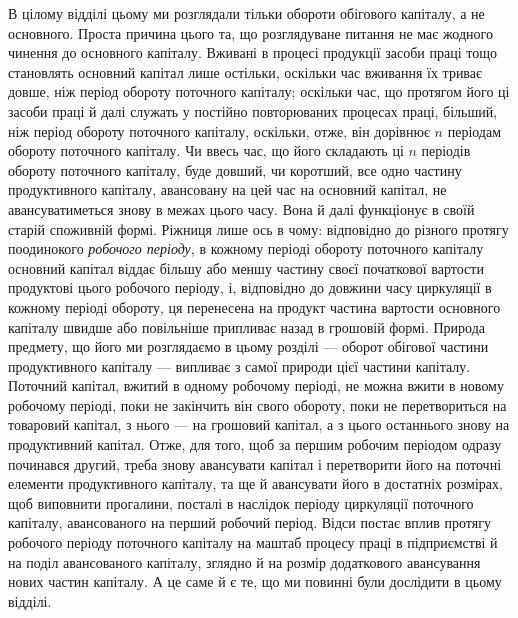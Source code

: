 В цілому відділі цьому ми розглядали тільки обороти обігового капіталу,
а не основного. Проста причина цього та, що розглядуване питання
не має жодного чинення до основного капіталу. Вживані в процесі продукції
засоби праці тощо становлять основний капітал лише остільки,
оскільки час вживання їх триває довше, ніж період обороту поточного
капіталу; оскільки час, що протягом його ці засоби праці й далі служать
у постійно повторюваних процесах праці, більший, ніж період обороту
поточного капіталу, оскільки, отже, він дорівнює $n$ періодам обороту
поточного капіталу. Чи ввесь час, що його складають ці $n$ періодів обороту
поточного капіталу, буде довший, чи коротший, все одно частину
продуктивного капіталу, авансовану на цей час на основний капітал, не
авансуватиметься знову в межах цього часу. Вона й далі функціонує в
своїй старій споживній формі. Ріжниця лише ось в чому: відповідно до
різного протягу поодинокого \emph{робочого періоду}, в кожному періоді
обороту поточного капіталу основний капітал віддає більшу або меншу
частину своєї початкової вартости продуктові цього робочого періоду, і,
відповідно до довжини часу циркуляції в кожному періоді обороту, ця
перенесена на продукт частина вартости основного капіталу швидше або
повільніше припливає назад в грошовій формі. Природа предмету, що
його ми розглядаємо в цьому розділі — оборот обігової частини продуктивного
капіталу — випливає з самої природи цієї частини капіталу. Поточний
капітал, вжитий в одному робочому періоді, не можна вжити в
новому робочому періоді, поки не закінчить він свого обороту, поки не
перетвориться на товаровий капітал, з нього — на грошовий капітал, а
з цього останнього знову на продуктивний капітал. Отже, для того, щоб
за першим робочим періодом одразу починався другий, треба знову
авансувати капітал і перетворити його на поточні елементи продуктивного
капіталу, та ще й авансувати його в достатніх розмірах, щоб виповнити
прогалини, посталі в наслідок періоду циркуляції поточного
капіталу, авансованого на перший робочий період. Відси постає вплив
протягу робочого періоду поточного капіталу на маштаб процесу праці
в підприємстві й на поділ авансованого капіталу, зглядно й на розмір
додаткового авансування нових частин капіталу. А це саме й є те, що ми
повинні були дослідити в цьому відділі.
